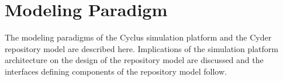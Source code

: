 \chapter{Modeling Paradigm}\label{ch:paradigm}

The modeling paradigms of the Cyclus simulation platform and the Cyder 
repository model are described here. Implications of the 
simulation platform architecture on the design of the repository model 
are discussed and the interfaces defining components of the repository 
model follow. 




